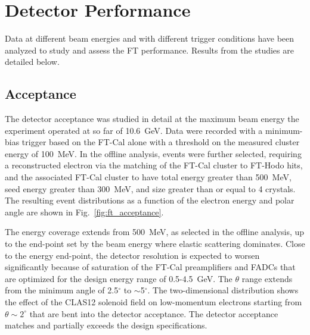 \section{Detector Performance}
\label{sec:performance}

Data at different beam energies and with different trigger conditions have been analyzed to study and assess the
FT performance. Results from the studies are detailed below.

\subsection{Acceptance}

The detector acceptance was studied in detail at the maximum beam energy the experiment operated at so far of
10.6~GeV. Data were recorded with a minimum-bias trigger based on the FT-Cal alone with a threshold on the
measured cluster energy of 100~MeV. In the offline analysis, events were further selected, requiring a reconstructed
electron via the matching of the FT-Cal cluster to FT-Hodo hits, and the associated FT-Cal cluster to have total energy
greater than 500~MeV, seed energy greater than 300~MeV, and size greater than or equal to 4 crystals. The resulting
event distributions as a function of the electron energy and polar angle are shown in Fig.~\ref{fig:ft_acceptance}. 

The energy coverage extends from 500~MeV, as selected in the offline analysis, up to the end-point set by the
beam energy where elastic scattering dominates. Close to the energy end-point, the detector resolution is expected
to worsen significantly because of saturation of the FT-Cal preamplifiers and FADCs that are optimized for the
design energy range of 0.5-4.5~GeV. The $\theta$ range extends from the minimum angle of 2.5$^\circ$ to
$\sim$5$^\circ$. The two-dimensional distribution shows the effect of the CLAS12 solenoid field on low-momentum
electrons starting from $\theta\sim2^\circ$ that are bent into the detector acceptance. The detector
acceptance matches and partially exceeds the design specifications. 

